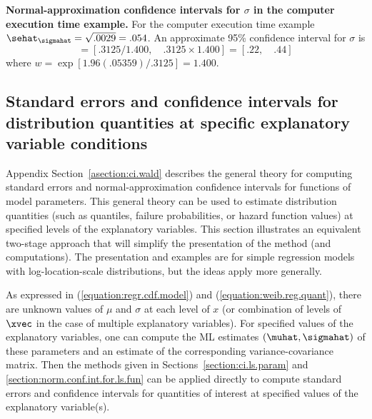 \begin{example}
{\bf Normal-approximation confidence intervals
for  $\sigma$ in the computer execution time example.}
\label{example:normal.theory.ci.for.ct.sigma}
For the computer execution time example 
$\sehat_{\sigmahat}=\sqrt{.0029}=.054$. An approximate 95\% confidence
interval for $\sigma$ is
\begin{displaymath}
[ \undertilde{\sigma}, \quad \tilde{\sigma}] =
[.3125/1.400, \quad
.3125 \times 1.400]  = [ .22    , \quad  .44  ]
\end{displaymath}
where $w=\exp[1.96(.05359)/.3125]=1.400$.
\end{example}

\subsection{Standard errors and confidence intervals for 
distribution quantities at specific explanatory variable conditions}
\label{section:se.and.ci.for.regr.funct}

Appendix Section~\ref{asection:ci.wald} describes the general theory for
computing standard errors and normal-approximation confidence
intervals for functions of model parameters. This general theory can
be used to estimate distribution quantities (such as quantiles,
failure probabilities, or hazard function values) at specified levels
of the explanatory variables.  This section illustrates an equivalent
two-stage approach that will simplify the presentation of the method
(and computations). The presentation and examples are for simple
regression models with log-location-scale distributions, but the ideas
apply more generally.

As expressed in (\ref{equation:regr.cdf.model}) and
(\ref{equation:weib.reg.quant}), there are unknown values of $\mu$ and
$\sigma$ at each level of $x$ (or combination of levels of $\xvec$ in
the case of multiple explanatory variables). For specified values of
the explanatory variables, one can compute the ML estimates $(\muhat,
\sigmahat)$ of these parameters and an estimate of the corresponding
variance-covariance matrix. Then the methods given in
Sections~\ref{section:ci.ls.param} and
\ref{section:norm.conf.int.for.ls.fun} can
be applied directly to compute standard errors and
confidence intervals for quantities of interest at specified values of
the explanatory variable(s). 

